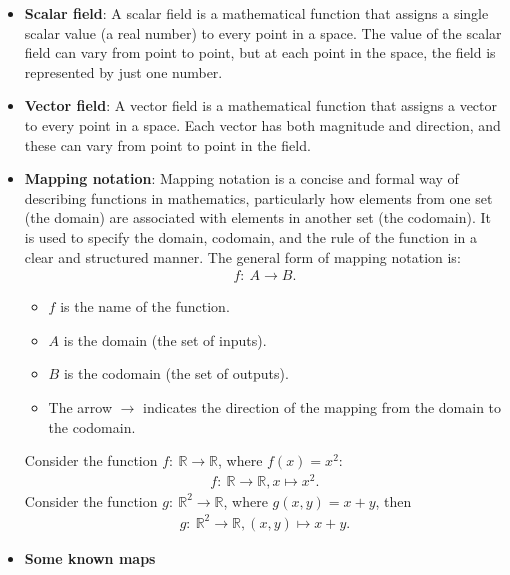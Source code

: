 \documentclass{report}
\begin{document}
\begin{itemize}
        \item \textbf{Scalar field}: A scalar field is a mathematical function that assigns a single scalar value (a real number) to every point in a space. The value of the scalar field can vary from point to point, but at each point in the space, the field is represented by just one number.
        \item \textbf{Vector field}: A vector field is a mathematical function that assigns a vector to every point in a space. Each vector has both magnitude and direction, and these can vary from point to point in the field.
        \item \textbf{Mapping notation}: Mapping notation is a concise and formal way of describing functions in mathematics, particularly how elements from one set (the domain) are associated with elements in another set (the codomain). It is used to specify the domain, codomain, and the rule of the function in a clear and structured manner.
            \bigbreak \noindent 
            The general form of mapping notation is:
            \begin{align*}
                f:\ A \to B
            .\end{align*}
            \begin{itemize}
                \item $f$ is the name of the function.
                \item $A$ is the domain (the set of inputs).
                \item $B$ is the codomain (the set of outputs).
                \item The arrow $\to$ indicates the direction of the mapping from the domain to the codomain.
            \end{itemize}
            \bigbreak \noindent 
            Consider the function $f:\ \mathbb{R}  \to \mathbb{R}$, where $f(x) = x^{2}$:
            \begin{align*}
                f:\ \mathbb{R} \to \mathbb{R}, x \mapsto x^{2}
            .\end{align*}
            \bigbreak \noindent 
            Consider the function $g:\ \mathbb{R}^{2} \to \mathbb{R}$, where $g(x,y) = x + y$, then 
            \begin{align*}
               g:\ \mathbb{R}^{2} \to \mathbb{R}, (x,y) \mapsto x + y  
            .\end{align*}
        \item \textbf{Some known maps}
            \begin{align*}

\end{align*}
\end{itemize}
\end{document}
